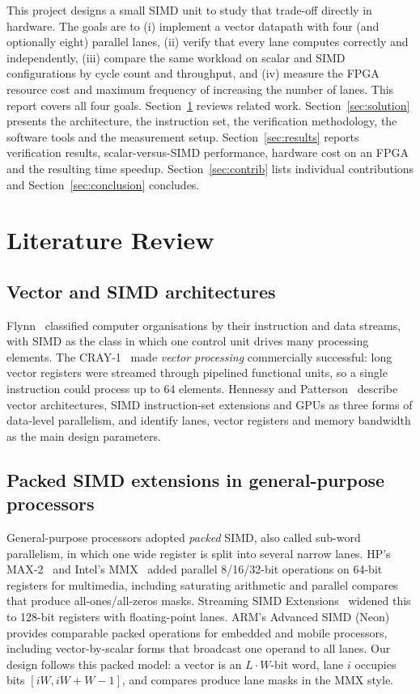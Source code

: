 \documentclass[conference]{IEEEtran}
\begin{document}
This project designs a small SIMD unit to study that trade-off directly in
hardware. The goals are to
(i) implement a vector datapath with four (and optionally eight) parallel lanes,
(ii) verify that every lane computes correctly and independently,
(iii) compare the same workload on scalar and SIMD configurations by cycle
count and throughput, and
(iv) measure the FPGA resource cost and maximum frequency of increasing the
number of lanes.
This report covers all four goals. Section~\ref{sec:lit} reviews related
work. Section~\ref{sec:solution} presents the architecture, the instruction set,
the verification methodology, the software tools and the measurement setup.
Section~\ref{sec:results} reports verification results, scalar-versus-SIMD
performance, hardware cost on an FPGA and the resulting time speedup.
Section~\ref{sec:contrib} lists individual contributions and
Section~\ref{sec:conclusion} concludes.
\section{Literature Review}
\label{sec:lit}

\subsection{Vector and SIMD architectures}
Flynn~\cite{flynn1972} classified computer organisations by their instruction
and data streams, with SIMD as the class in which one control unit drives many
processing elements. The CRAY-1~\cite{russell1978} made \emph{vector processing}
commercially successful: long vector registers were streamed through pipelined
functional units, so a single instruction could process up to 64 elements.
Hennessy and Patterson~\cite{hennessy2017} describe vector architectures, SIMD
instruction-set extensions and GPUs as three forms of data-level parallelism,
and identify lanes, vector registers and memory bandwidth as the main design
parameters.

\subsection{Packed SIMD extensions in general-purpose processors}
General-purpose processors adopted \emph{packed} SIMD, also called sub-word
parallelism, in which one wide register is split into several narrow lanes. HP's MAX-2~\cite{lee1996} and
Intel's MMX~\cite{peleg1996} added parallel 8/16/32-bit operations on 64-bit
registers for multimedia, including saturating arithmetic and parallel compares
that produce all-ones/all-zeros masks. Streaming SIMD Extensions~\cite{thakkar1999}
widened this to 128-bit registers with floating-point lanes. ARM's Advanced
SIMD (Neon)~\cite{armneon} provides comparable packed operations for embedded and
mobile processors, including vector-by-scalar forms that broadcast one operand to
all lanes. Our design follows this packed model: a vector is an $L\cdot W$-bit
word, lane $i$ occupies bits $[iW, iW+W-1]$, and compares produce lane masks in
the MMX style.
\end{document}
